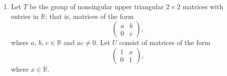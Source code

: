 {\begin{enumerate}
 
% 
% 
% 
% 
% 
% 
 
 
\item
Let $T$ be the group of nonsingular upper triangular $2 \times 2$
matrices with entries in ${\mathbb R}$; that is, matrices of the form
\[
\begin{pmatrix}
a & b \\
0 & c
\end{pmatrix},
\]
where $a$, $b$, $c \in {\mathbb R}$ and $ac \neq 0$. Let $U$ consist of
matrices of the form 
\[
\begin{pmatrix}
1 & x \\
0 & 1
\end{pmatrix},
\]
where $x \in {\mathbb R}$.
\begin{enumerate}
 

\end{enumerate}
\end{enumerate}}
